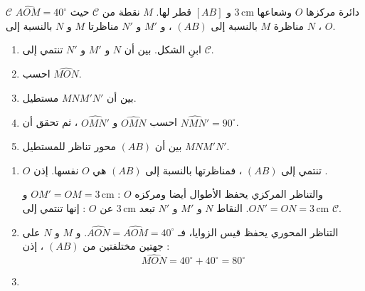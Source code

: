 \documentclass[12pt,a4paper]{article}
\newcommand{\cm}{\,\mathrm{cm}}
\begin{document}
\begin{corr}[title={تركيب : دائرة ومستطيل}, stars=3, source={Axiomaths}]
$\mathcal{C}$ دائرة مركزها $O$ وشعاعها $3\cm$ و $[AB]$ قطر لها. $M$ نقطة من $\mathcal{C}$ حيث $\widehat{AOM}=40^\circ$ ، $N$ مناظرة $M$ بالنسبة إلى $(AB)$ ، و $M'$ و $N'$ مناظرتا $M$ و $N$ بالنسبة إلى $O$.
\begin{enumerate}
  \item ابنِ الشكل. بين أن $N$ و $M'$ و $N'$ تنتمي إلى $\mathcal{C}$.
  \item احسب $\widehat{MON}$.
  \item بين أن $MNM'N'$ مستطيل.
  \item احسب $\widehat{OMN}$ و $\widehat{OMN'}$ ، ثم تحقق أن $\widehat{NMN'}=90^\circ$.
  \item بين أن $(AB)$ محور تناظر للمستطيل $MNM'N'$.
\end{enumerate}
\axsol
\begin{enumerate}[itemsep=14pt]
  \item\leavevmode
  \begin{prop}
  $O$ تنتمي إلى $(AB)$ ، فمناظرتها بالنسبة إلى $(AB)$ هي $O$ نفسها. إذن \ib{$ON=OM=3\cm$}.
  \end{prop}
  والتناظر المركزي يحفظ الأطوال أيضا ومركزه $O$ : $OM'=OM=3\cm$ و $ON'=ON=3\cm$. النقاط $N$ و $M'$ و $N'$ تبعد $3\cm$ عن $O$ : إنها تنتمي إلى $\mathcal{C}$.
  \begin{center}
  \end{center}
  \item التناظر المحوري يحفظ قيس الزوايا، فـ $\widehat{AON}=\widehat{AOM}=40^\circ$. و $M$ و $N$ على جهتين مختلفتين من $(AB)$ ، إذن :
  \[\widehat{MON}=40^\circ+40^\circ=80^\circ\]
  \item \begin{prop}

\end{prop}
\end{enumerate}
\end{corr}
\end{document}
